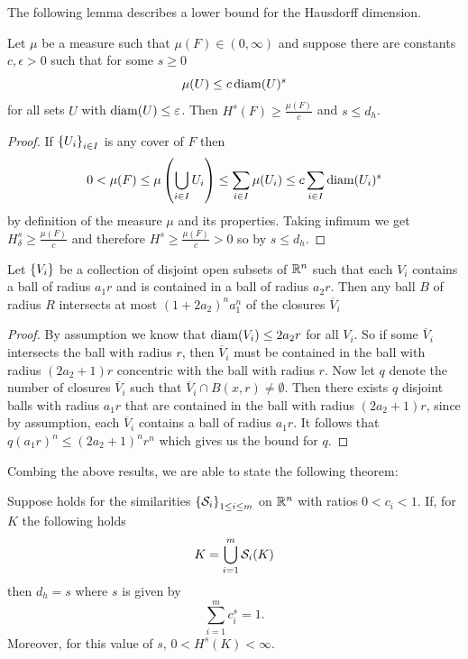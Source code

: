 \medskip
The following lemma describes a lower bound for the Hausdorff dimension.
\begin{lemma}\label{massDistribution}
	Let $\mu$ be a measure such that $\mu(F) \in (0, \infty)$ and suppose there are constants $c, \epsilon > 0$ such that for some $s \geq 0$
	\begin{equation}
		\mu(U) \leq c \operatorname{diam}(U)^{s}
	\end{equation}
	for all sets $U$ with $\operatorname{diam}(U) \leq \varepsilon$. Then $H^{s}(F) \geq \frac{\mu(F)}{c}$ and $s \leq d_h$.
\end{lemma}
\begin{proof}
	If $\cbr{U_i}_{i \in I}$ is any cover of $F$ then
	\begin{equation}
		0 < \mu(F) \leq \mu \left(\bigcup_{i \in I} U_i\right) \leq \sum_{i \in I} \mu(U_i) \leq c \sum_{i \in I} \diam(U_i)^{s}
	\end{equation}
	by definition of the measure $\mu$ and its properties. Taking infimum we get $H^{s}_{\delta} \geq \frac{\mu(F)}{c}$ and therefore $H^{s} \geq \frac{\mu(F)}{c} > 0$ so by  $s \leq d_h$.
\end{proof}

\medskip
\begin{lemma}\label{theConstq}
	Let $\cbr{V_i}$ be a collection of disjoint open subsets of $\mathbb{R}^{n}$ such that each $V_i$ contains a ball of radius $a_1r$ and is contained in a ball of radius $a_2r$. Then any ball $B$ of radius $R$ intersects at most $(1+2a_2)^{n}a_{1}^{n}$ of the closures $\overline{V}_i$
\end{lemma}
\begin{proof}
	By assumption we know that $\operatorname{diam}(V_i) \leq 2a_2 r$ for all $V_i$. So if some $\overline{V}_i$ intersects the ball with radius $r$, then $\overline{V}_i$ must be contained in the ball with radius $(2a_2 + 1)r$ concentric with the ball with radius $r$.  Now let $q$ denote the number of closures $\overline{V}_i$ such that $\overline{V}_i \cap B(x,r) \neq \emptyset$. Then there exists $q$ disjoint balls with radius $a_1r$ that are contained in the ball with radius $(2a_2 +1)r$, since by assumption, each $\overline{V}_i$ contains a ball of radius $a_1r$. It follows that $q(a_1r)^{n} \leq (2a_2 +1)^{n}r^{n}$ which gives us the bound for $q$.
\end{proof}

Combing the above results, we are able to state the following theorem:

\medskip
\begin{theorem}\label{HausdorffDimTheorem}
	Suppose  holds for the similarities $\cbr{\fracConst_i}_{1 \leq i \leq m}$ on $\mathbb{R}^{n}$ with ratios $0 < c_i < 1$. If, for $K$ the following holds
	\begin{equation}\label{hausDorffDimCondition}
		K = \bigcup_{i = 1}^{m} \mathcal{S}_i(K)
	\end{equation}
	then $d_h = s$ where $s$ is given by
	\begin{equation}\label{hausDorffDimRatioSum}
		\sum_{i = 1}^{m} c_i^{s} = 1.
	\end{equation}
	Moreover, for this value of $s$, $0 < H^s(K) < \infty$.
\end{theorem}

